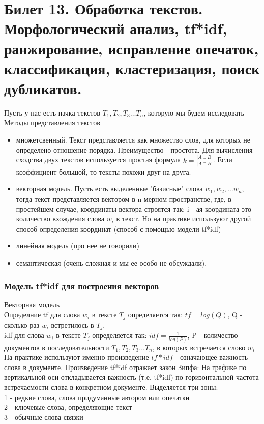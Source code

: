 \newpage
\section {Билет 13. Обработка текстов. Морфологический анализ, tf*idf, ранжирование, исправление опечаток, классификация, кластеризация, поиск дубликатов.}

Пусть у нас есть пачка текстов $T_1, T_2, T_3 \dots T_n$, которую мы будем исследовать \\
Методы представления текстов
\begin{itemize}
\item множетсвенный. Текст представляется как множество слов, для которых не определено отношение порядка. Преимущество - простота. Для вычисления сходства двух текстов используется простая формула $k = \frac {|A \cup B|}{|A \cap B|}$. Если коэффициент большой, то тексты похожи друг на друга.
\item векторная модель. Пусть есть выделенные  "базисные" слова $w_1, w_2, \dots w_n$, тогда текст представляется вектором в n-мерном пространстве, где, в простейшем случае, координаты вектора строятся так: i - ая координата это количество вхождения слова $w_i$ в текст. Но на практике используют другой способ определения координат (способ с помощью модели tf*idf)  
\item линейная модель (про нее не говорили)
\item семантическая (очень сложная и мы ее особо не обсуждали).
\end{itemize}

\subsubsection {Модель tf*idf для построения векторов}
\href{https://ru.wikipedia.org/wiki/Векторная_модель}{Векторная модель} \\
\underline {Определние}
tf для слова $w_i$ в тексте $T_j$ определяется так: 
 $tf = log (Q)$, Q - сколько раз $w_i$ встретилось в $T_j$.  \\
idf для слова $w_i$ в тексте $T_j$ определяется так: 
$idf = \frac{1}{log(P)}$, P - количество документов в последовательности $T_1, T_2, T_3 \dots T_n$, в которых встречается слово $w_i$ \\
На практике используют именно произведение $tf*idf$ - означающее важность слова в документе. Произведение tf*idf отражает закон Зипфа:
На графике по вертикальной оси откладывается важность (т.е. tf*idf) по горизонтальной частота встречаемости слова в конкретном документе.
Выделяется три зоны: \\
1 - редкие слова, слова придуманные автором или опечатки \\
2 - ключевые слова, определяющие текст \\
3 - обычные слова связки \\

